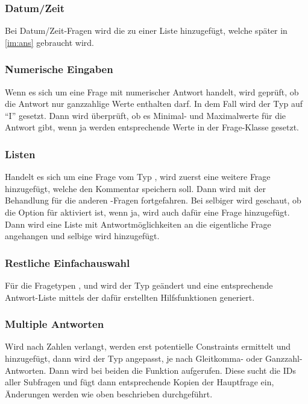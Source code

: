 \subsubsection{Datum/Zeit}
Bei Datum/Zeit-Fragen wird die  zu einer Liste hinzugefügt, welche später in \cref{im:ans} gebraucht wird.

\subsubsection{Numerische Eingaben}
Wenn es sich um eine Frage mit numerischer Antwort handelt, wird geprüft, ob die Antwort nur ganzzahlige Werte enthalten darf. In dem Fall wird der Typ auf \enquote{I} gesetzt. 
Dann wird überprüft, ob es Minimal- und Maximalwerte für die Antwort gibt, wenn ja werden entsprechende Werte in der Frage-Klasse gesetzt.

\subsubsection{Listen}
Handelt es sich um eine Frage vom Typ , wird zuerst eine weitere Frage hinzugefügt, welche den Kommentar speichern soll.
Dann wird mit der Behandlung für die anderen -Fragen fortgefahren.
Bei selbiger wird geschaut, ob die Option für  aktiviert ist, wenn ja, wird auch dafür eine Frage hinzugefügt.
Dann wird eine Liste mit Antwortmöglichkeiten an die eigentliche Frage angehangen und selbige wird hinzugefügt.

\subsubsection{Restliche Einfachauswahl}
Für die Fragetypen ,  und  wird der Typ geändert und eine entsprechende Antwort-Liste mittels der dafür erstellten Hilfsfunktionen generiert.

\subsubsection{Multiple Antworten}

Wird nach Zahlen verlangt, werden erst potentielle Constraints ermittelt und hinzugefügt, dann wird der Typ angepasst, je nach Gleitkomma- oder Ganzzahl-Antworten.
Dann wird bei beiden die Funktion  aufgerufen.
Diese sucht die IDs aller Subfragen und fügt dann entsprechende Kopien der Hauptfrage ein, Änderungen werden wie oben beschrieben durchgeführt.

